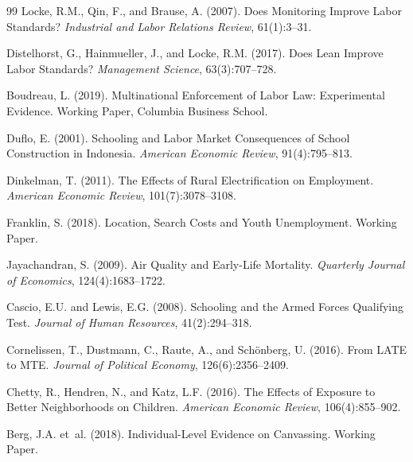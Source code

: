 \documentclass[12pt]{article}
\begin{document}
\begin{thebibliography}{99}
Locke, R.M., Qin, F., and Brause, A. (2007).
\newblock Does Monitoring Improve Labor Standards?
\newblock \textit{Industrial and Labor Relations Review}, 61(1):3--31.

Distelhorst, G., Hainmueller, J., and Locke, R.M. (2017).
\newblock Does Lean Improve Labor Standards?
\newblock \textit{Management Science}, 63(3):707--728.

Boudreau, L. (2019).
\newblock Multinational Enforcement of Labor Law: Experimental Evidence.
\newblock Working Paper, Columbia Business School.

Duflo, E. (2001).
\newblock Schooling and Labor Market Consequences of School Construction in Indonesia.
\newblock \textit{American Economic Review}, 91(4):795--813.

Dinkelman, T. (2011).
\newblock The Effects of Rural Electrification on Employment.
\newblock \textit{American Economic Review}, 101(7):3078--3108.

Franklin, S. (2018).
\newblock Location, Search Costs and Youth Unemployment.
\newblock Working Paper.

Jayachandran, S. (2009).
\newblock Air Quality and Early-Life Mortality.
\newblock \textit{Quarterly Journal of Economics}, 124(4):1683--1722.

Cascio, E.U. and Lewis, E.G. (2008).
\newblock Schooling and the Armed Forces Qualifying Test.
\newblock \textit{Journal of Human Resources}, 41(2):294--318.

Cornelissen, T., Dustmann, C., Raute, A., and Sch{\"o}nberg, U. (2016).
\newblock From LATE to MTE.
\newblock \textit{Journal of Political Economy}, 126(6):2356--2409.

Chetty, R., Hendren, N., and Katz, L.F. (2016).
\newblock The Effects of Exposure to Better Neighborhoods on Children.
\newblock \textit{American Economic Review}, 106(4):855--902.

Berg, J.A. et~al. (2018).
\newblock Individual-Level Evidence on Canvassing.
\newblock Working Paper.


\end{thebibliography}
\end{document}
